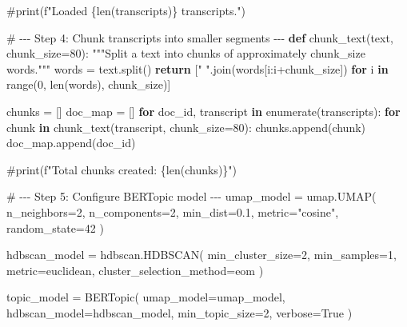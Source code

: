 \documentclass[
  letterpaper,
  DIV=11,
  numbers=noendperiod]{scrartcl}
\newenvironment{Shaded}{\begin{snugshade}}{\end{snugshade}}
\newcommand{\BuiltInTok}[1]{\textcolor[rgb]{0.00,0.23,0.31}{#1}}
\newcommand{\CommentTok}[1]{\textcolor[rgb]{0.37,0.37,0.37}{#1}}
\newcommand{\ControlFlowTok}[1]{\textcolor[rgb]{0.00,0.23,0.31}{\textbf{#1}}}
\newcommand{\DecValTok}[1]{\textcolor[rgb]{0.68,0.00,0.00}{#1}}
\newcommand{\FloatTok}[1]{\textcolor[rgb]{0.68,0.00,0.00}{#1}}
\newcommand{\KeywordTok}[1]{\textcolor[rgb]{0.00,0.23,0.31}{\textbf{#1}}}
\newcommand{\NormalTok}[1]{\textcolor[rgb]{0.00,0.23,0.31}{#1}}
\newcommand{\OperatorTok}[1]{\textcolor[rgb]{0.37,0.37,0.37}{#1}}
\newcommand{\StringTok}[1]{\textcolor[rgb]{0.13,0.47,0.30}{#1}}
\newcommand{\VariableTok}[1]{\textcolor[rgb]{0.07,0.07,0.07}{#1}}
\begin{document}
\begin{Shaded}
\begin{Highlighting}[]
\CommentTok{\#print(f"Loaded \{len(transcripts)\} transcripts.")}
 
\CommentTok{\# {-}{-}{-} Step 4: Chunk transcripts into smaller segments {-}{-}{-}}
\KeywordTok{def}\NormalTok{ chunk\_text(text, chunk\_size}\OperatorTok{=}\DecValTok{80}\NormalTok{):}
    \CommentTok{"""Split a text into chunks of approximately \textasciigrave{}chunk\_size\textasciigrave{} words."""}
\NormalTok{    words }\OperatorTok{=}\NormalTok{ text.split()}
    \ControlFlowTok{return}\NormalTok{ [}\StringTok{" "}\NormalTok{.join(words[i:i}\OperatorTok{+}\NormalTok{chunk\_size]) }\ControlFlowTok{for}\NormalTok{ i }\KeywordTok{in} \BuiltInTok{range}\NormalTok{(}\DecValTok{0}\NormalTok{, }\BuiltInTok{len}\NormalTok{(words), chunk\_size)]}

\NormalTok{chunks }\OperatorTok{=}\NormalTok{ []}
\NormalTok{doc\_map }\OperatorTok{=}\NormalTok{ []}
\ControlFlowTok{for}\NormalTok{ doc\_id, transcript }\KeywordTok{in} \BuiltInTok{enumerate}\NormalTok{(transcripts):}
    \ControlFlowTok{for}\NormalTok{ chunk }\KeywordTok{in}\NormalTok{ chunk\_text(transcript, chunk\_size}\OperatorTok{=}\DecValTok{80}\NormalTok{):}
\NormalTok{        chunks.append(chunk)}
\NormalTok{        doc\_map.append(doc\_id)}

\CommentTok{\#print(f"Total chunks created: \{len(chunks)\}")}
 
\CommentTok{\# {-}{-}{-} Step 5: Configure BERTopic model {-}{-}{-}}
\NormalTok{umap\_model }\OperatorTok{=}\NormalTok{ umap.UMAP(}
\NormalTok{    n\_neighbors}\OperatorTok{=}\DecValTok{2}\NormalTok{,}
\NormalTok{    n\_components}\OperatorTok{=}\DecValTok{2}\NormalTok{,}
\NormalTok{    min\_dist}\OperatorTok{=}\FloatTok{0.1}\NormalTok{,}
\NormalTok{    metric}\OperatorTok{=}\StringTok{"cosine"}\NormalTok{,}
\NormalTok{    random\_state}\OperatorTok{=}\DecValTok{42}
\NormalTok{)}

\NormalTok{hdbscan\_model }\OperatorTok{=}\NormalTok{ hdbscan.HDBSCAN(}
\NormalTok{    min\_cluster\_size}\OperatorTok{=}\DecValTok{2}\NormalTok{,}
\NormalTok{    min\_samples}\OperatorTok{=}\DecValTok{1}\NormalTok{,}
\NormalTok{    metric}\OperatorTok{=}\StringTok{\textquotesingle{}euclidean\textquotesingle{}}\NormalTok{,}
\NormalTok{    cluster\_selection\_method}\OperatorTok{=}\StringTok{\textquotesingle{}eom\textquotesingle{}}
\NormalTok{)}

\NormalTok{topic\_model }\OperatorTok{=}\NormalTok{ BERTopic(}
\NormalTok{    umap\_model}\OperatorTok{=}\NormalTok{umap\_model,}
\NormalTok{    hdbscan\_model}\OperatorTok{=}\NormalTok{hdbscan\_model,}
\NormalTok{    min\_topic\_size}\OperatorTok{=}\DecValTok{2}\NormalTok{,}
\NormalTok{    verbose}\OperatorTok{=}\VariableTok{True}
\NormalTok{)}
 

\end{Highlighting}
\end{Shaded}
\end{document}
